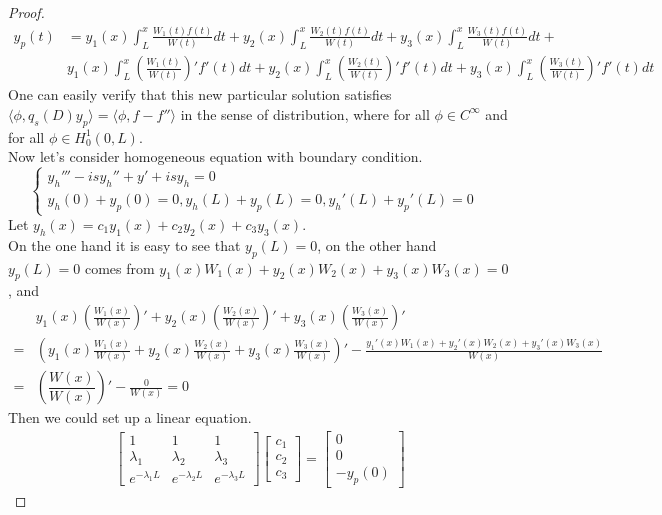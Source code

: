 \documentclass[a4paper,draft]{amsproc}
\theoremstyle{plain}
\theoremstyle{definition}
\theoremstyle{remark}
\numberwithin{equation}{section}
\begin{document}
\begin{proof}
\begin{equation*}
\begin{split}
y_p(t)&=y_1(x)\int_{L}^{x}\frac{W_1(t)f(t)}{W(t)} d t+y_2(x)\int_{L}^{x}\frac{W_2(t)f(t)}{W(t)} d t+y_3(x)\int_{L}^{x}\frac{W_3(t)f(t)}{W(t)} d t+\\&y_1(x)\int_{L}^{x}(\frac{W_1(t)}{W(t)})'f'(t) d t+y_2(x)\int_{L}^{x}(\frac{W_2(t)}{W(t)})'f'(t) d t+y_3(x)\int_{L}^{x}(\frac{W_3(t)}{W(t)})'f'(t) d t
\end{split}
\end{equation*}
One can easily verify that this new particular solution satisfies $\langle \phi, q_s(D)y_p\rangle=\langle \phi,f-f''\rangle$ in the sense of distribution, where for all $\phi \in C^{\infty}$ and for all $\phi \in H_0^1(0,L)$.\\
Now let's consider homogeneous equation with boundary condition. 
\begin{equation*}
\left\{
\begin{array}{lr}
y_h'''-isy_h''+y'+isy_h=0  &  \\
y_h(0)+y_p(0)=0,y_h(L)+y_p(L)=0,y_h'(L)+y_p'(L)=0
\end{array}
\right.
\end{equation*}
Let $y_h(x)=c_1y_1(x)+c_2y_2(x)+c_3y_3(x)$.\\
On the one hand it is easy to see that $y_p(L)=0$, on the other hand $y_p(L)=0$ comes from $y_1(x)W_1(x)+y_2(x)W_2(x)+y_3(x)W_3(x)=0$, and
\begin{equation*}
\begin{split}
&y_1(x)(\frac{W_1(x)}{W(x)})'+y_2(x)(\frac{W_2(x)}{W(x)})'+y_3(x)(\frac{W_3(x)}{W(x)})'\\
=&(y_1(x)\frac{W_1(x)}{W(x)}+y_2(x)\frac{W_2(x)}{W(x)}+y_3(x)\frac{W_3(x)}{W(x)})'
-\frac{y_1'(x)W_1(x)+y_2'(x)W_2(x)+y_3'(x)W_3(x)}{W(x)}\\
=&(\dfrac{W(x)}{W(x)})'-\frac{0}{W(x)}=0
\end{split}
\end{equation*}
Then we could set up a linear equation. 
\begin{equation*} 
\begin{split}
\begin{bmatrix} 1 & 1 &1 \\ \lambda_1 & \lambda_2 & \lambda_3 \\ e^{-\lambda_1 L}&e^{-\lambda_2L}&e^{-\lambda_3 L} \end{bmatrix} 
\begin{bmatrix} c_1\\c_2\\c_3 \end{bmatrix} =\begin{bmatrix} 0\\0\\-y_p(0) \end{bmatrix}

\end{split}
\end{equation*}
\end{proof}
\end{document}
